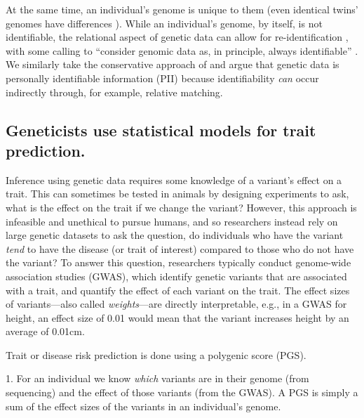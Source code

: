 At the same time, an individual's genome is unique to them (even identical twins' genomes have differences \cite{ormond_whole_2024}). While an individual's genome, by itself, is not identifiable, the relational aspect of genetic data can allow for re-identification \cite{shabani_reidentifiability_2019, bonomi_privacy_2020}, with some calling to ``consider genomic data as, in principle, always identifiable'' \cite{bonomi_privacy_2020}.  We similarly take the conservative approach of \cite{bonomi_privacy_2020} and argue that genetic data is personally identifiable information (PII) because identifiability \textit{can} occur indirectly through, for example, relative matching. 
\subsection{Geneticists use statistical models for trait prediction.}

Inference using genetic data requires some knowledge of a variant's effect on a trait. This can sometimes be tested in animals by designing experiments to ask, what is the effect on the trait if we change the variant? However, this approach is infeasible and unethical to pursue humans, and so researchers instead rely on large genetic datasets to ask the question, do individuals who have the variant \textit{tend} to have the disease (or trait of interest) compared to those who do not have the variant? To answer this question, researchers typically conduct genome-wide association studies (GWAS), 
which identify genetic variants that are associated with a trait, and quantify the effect of each variant on the trait. The effect sizes of variants—also called \textit{weights}—are directly interpretable, e.g., in a GWAS for height, an effect size of 0.01 would mean that the variant increases height by an average of 0.01cm.

Trait or disease risk prediction is done using a polygenic score (PGS). 


1. For an individual we know \textit{which} variants are in their genome (from sequencing) and the effect of those variants (from the GWAS). A PGS is simply a sum of the effect sizes of the variants in an individual's genome.

